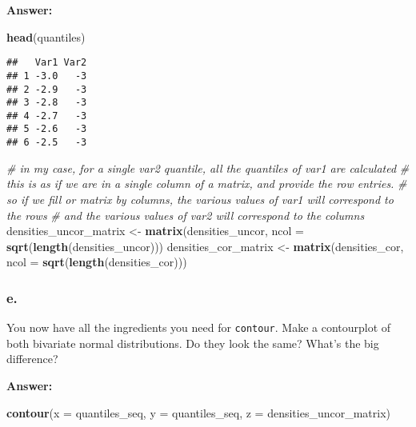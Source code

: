 \documentclass[]{article}
\newenvironment{Shaded}{\begin{snugshade}}{\end{snugshade}}
\newcommand{\CommentTok}[1]{\textcolor[rgb]{0.56,0.35,0.01}{\textit{#1}}}
\newcommand{\DataTypeTok}[1]{\textcolor[rgb]{0.13,0.29,0.53}{#1}}
\newcommand{\KeywordTok}[1]{\textcolor[rgb]{0.13,0.29,0.53}{\textbf{#1}}}
\newcommand{\NormalTok}[1]{#1}
\newcommand{\StringTok}[1]{\textcolor[rgb]{0.31,0.60,0.02}{#1}}
\begin{document}
\textbf{Answer:}

\begin{Shaded}
\begin{Highlighting}[]
\KeywordTok{head}\NormalTok{(quantiles)}
\end{Highlighting}
\end{Shaded}

\begin{verbatim}
##   Var1 Var2
## 1 -3.0   -3
## 2 -2.9   -3
## 3 -2.8   -3
## 4 -2.7   -3
## 5 -2.6   -3
## 6 -2.5   -3
\end{verbatim}

\begin{Shaded}
\begin{Highlighting}[]
\CommentTok{# in my case, for a single var2 quantile, all the quantiles of var1 are calculated}
\CommentTok{# this is as if we are in a single column of a matrix, and provide the row entries.}
\CommentTok{# so if we fill or matrix by columns, the various values of var1 will correspond to the rows}
\CommentTok{# and the various values of var2 will correspond to the columns}
\NormalTok{densities_uncor_matrix <-}\StringTok{ }\KeywordTok{matrix}\NormalTok{(densities_uncor, }\DataTypeTok{ncol =} \KeywordTok{sqrt}\NormalTok{(}\KeywordTok{length}\NormalTok{(densities_uncor)))}
\NormalTok{densities_cor_matrix <-}\StringTok{ }\KeywordTok{matrix}\NormalTok{(densities_cor, }\DataTypeTok{ncol =} \KeywordTok{sqrt}\NormalTok{(}\KeywordTok{length}\NormalTok{(densities_cor)))}
\end{Highlighting}
\end{Shaded}

\hypertarget{e.}{%
\subsubsection{e.}\label{e.}}

You now have all the ingredients you need for \texttt{contour}. Make a
contourplot of both bivariate normal distributions. Do they look the
same? What's the big difference?

\textbf{Answer:}

\begin{Shaded}
\begin{Highlighting}[]
\KeywordTok{contour}\NormalTok{(}\DataTypeTok{x =}\NormalTok{ quantiles_seq, }\DataTypeTok{y =}\NormalTok{ quantiles_seq, }\DataTypeTok{z =}\NormalTok{ densities_uncor_matrix)}
\end{Highlighting}
\end{Shaded}
\end{document}
